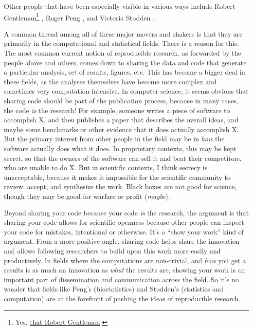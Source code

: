 \documentclass{book}
\begin{document}
Other people that have been especially visible in various ways include Robert Gentleman\footnote{Yes, \href{http://www.r-project.org/}{that Robert Gentleman}.
 } \parencite[e.g.,][]{gentleman2004statistical, gentleman2005reproducible}, Roger Peng \parencite[e.g.,][]{peng2009reproducible, peng2008caching, }, and Victoria Stodden \parencite[e.g.,][]{stodden2009enabling, stodden2010reproducible, stodden2011trust, stodden2012reproducible}.

A common thread among all of these major movers and shakers is that they are primarily in the computational and statistical fields. There is a reason for this. The most common current notion of reproducible research, as forwarded by the people above and others, comes down to sharing the data and code that generate a particular analysis, set of results, figures, etc.  This has become a bigger deal in these fields, as the analyses themselves have become more complex and sometimes very computation-intensive. In computer science, it seems obvious that sharing code should be part of the publication process, because in many cases, the code \emph{is} the research!  For example, someone writes a piece of software to accomplish X, and then publishes a paper that describes the overall ideas, and maybe some benchmarks or other evidence that it does actually accomplish X.  But the primary interest from other people in the field may be in \emph{how} the software actually does what it does. In proprietary contexts, this may be kept secret, so that the owners of the software can sell it and beat their competitors, who are unable to do X.  But in scientific contexts, I think secrecy is unacceptable, because it makes it impossible for the scientific community to review, accept, and synthesize the work.  Black boxes are not good for science, though they may be good for warfare or profit (\emph{maybe}).

Beyond sharing your code because your code \emph{is} the research, the argument is that sharing your code allows for scientific openness because other people can inspect your code for mistakes, intentional or otherwise. It's a ``show your work'' kind of argument. From a more positive angle, sharing code helps share the innovation and allows following researchers to build upon this work more easily and productively. In fields where the computations are non-trivial, and \emph{how} you get a results is as much an innovation as \emph{what} the results are, showing your work is an important part of dissemination and communication across the field.  So it's no wonder that fields like Peng's (biostatistics) and Stodden's (statistics and computation) are at the forefront of pushing the ideas of reproducible research.
\end{document}
